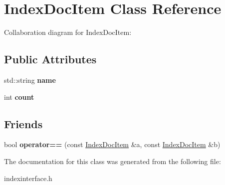 \hypertarget{classIndexDocItem}{}\section{Index\+Doc\+Item Class Reference}
\label{classIndexDocItem}


Collaboration diagram for Index\+Doc\+Item\+:
\subsection*{Public Attributes}
\begin{DoxyCompactItemize}
\item 
std\+::string {\bfseries name}\hypertarget{classIndexDocItem_a2c7f6f0cc0e686e91d85d34afdd73205}{}\label{classIndexDocItem_a2c7f6f0cc0e686e91d85d34afdd73205}

\item 
int {\bfseries count}\hypertarget{classIndexDocItem_abaab0c1efd8303ab02ebd872e15bb59e}{}\label{classIndexDocItem_abaab0c1efd8303ab02ebd872e15bb59e}

\end{DoxyCompactItemize}
\subsection*{Friends}
\begin{DoxyCompactItemize}
\item 
bool {\bfseries operator==} (const \hyperlink{classIndexDocItem}{Index\+Doc\+Item} \&a, const \hyperlink{classIndexDocItem}{Index\+Doc\+Item} \&b)\hypertarget{classIndexDocItem_a6c723d8f8b5321024d238239406c5193}{}\label{classIndexDocItem_a6c723d8f8b5321024d238239406c5193}

\end{DoxyCompactItemize}


The documentation for this class was generated from the following file\+:\begin{DoxyCompactItemize}
\item 
indexinterface.\+h\end{DoxyCompactItemize}
